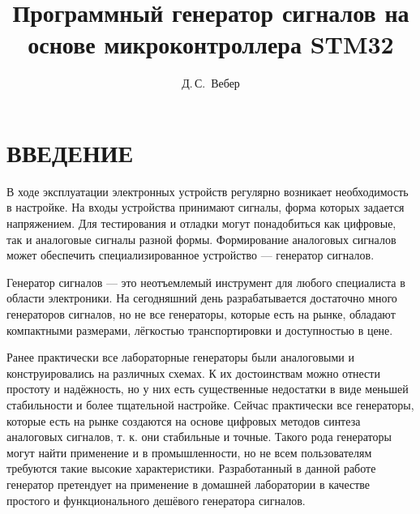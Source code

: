\documentclass[14pt, oneside]{altsu-bachelor}
\title{Программный генератор сигналов на основе микроконтроллера STM32}
\author{Д.\,С.~Вебер}
\institute{Институт цифровых технологий, электроники и физики}
\date{\the\year}
\begin{document}
\maketitle

\setcounter{page}{2}
\makeabstract
\tableofcontents

\chapter*{ВВЕДЕНИЕ}
	В ходе эксплуатации электронных устройств регулярно возникает необходимость в настройке. На входы устройства принимают сигналы, форма которых задается напряжением. Для тестирования и отладки могут понадобиться как цифровые, так и аналоговые сигналы разной формы. Формирование аналоговых сигналов может обеспечить специализированное устройство --- генератор сигналов.
	
	
	Генератор сигналов --- это неотъемлемый инструмент для любого специалиста в области электроники. %
	На сегодняшний день разрабатывается достаточно много генераторов сигналов, %
	 но не все генераторы, которые есть на рынке, обладают компактными размерами, лёгкостью транспортировки и доступностью в цене. %
	
	Ранее практически все лабораторные генераторы были аналоговыми и конструировались на различных схемах. К их достоинствам можно отнести простоту и надёжность, но у них есть существенные недостатки в виде меньшей стабильности и более тщательной настройке. Сейчас практически все генераторы, которые есть на рынке создаются на основе цифровых методов синтеза аналоговых сигналов, %
	 т. к. они стабильные и точные. %
	 Такого рода генераторы могут найти применение и в промышленности, но не всем пользователям требуются такие высокие характеристики. Разработанный в данной работе генератор претендует на применение в домашней лаборатории в качестве простого и функционального дешёвого генератора сигналов.
	
\end{document}
